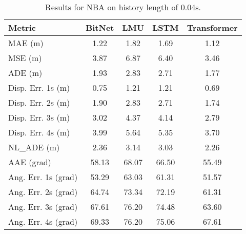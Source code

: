 \begin{table}[H]
\centering
\caption{Results for NBA on history length of 0.04s.}
\label{hist:NBA_0.04s}
\begin{tabular}{l||c|c|c|c}
Metric & BitNet & LMU & LSTM & Transformer \\
\hline \hline 
MAE (m) & 1.22 & 1.82 & 1.69 & 1.12 \\
MSE (m) & 3.87 & 6.87 & 6.40 & 3.46 \\
ADE (m) & 1.93 & 2.83 & 2.71 & 1.77 \\
Disp. Err. 1s (m) & 0.75 & 1.21 & 1.21 & 0.69 \\
Disp. Err. 2s (m) & 1.90 & 2.83 & 2.71 & 1.74 \\
Disp. Err. 3s (m) & 3.02 & 4.37 & 4.14 & 2.79 \\
Disp. Err. 4s (m) & 3.99 & 5.64 & 5.35 & 3.70 \\
NL\_ADE (m) & 2.36 & 3.14 & 3.03 & 2.26 \\
AAE (grad) & 58.13 & 68.07 & 66.50 & 55.49 \\
Ang. Err. 1s (grad) & 53.29 & 63.03 & 61.31 & 51.57 \\
Ang. Err. 2s (grad) & 64.74 & 73.34 & 72.19 & 61.31 \\
Ang. Err. 3s (grad) & 67.61 & 76.20 & 74.48 & 63.60 \\
Ang. Err. 4s (grad) & 69.33 & 76.20 & 75.06 & 67.61 \\
\end{tabular}
\end{table}

